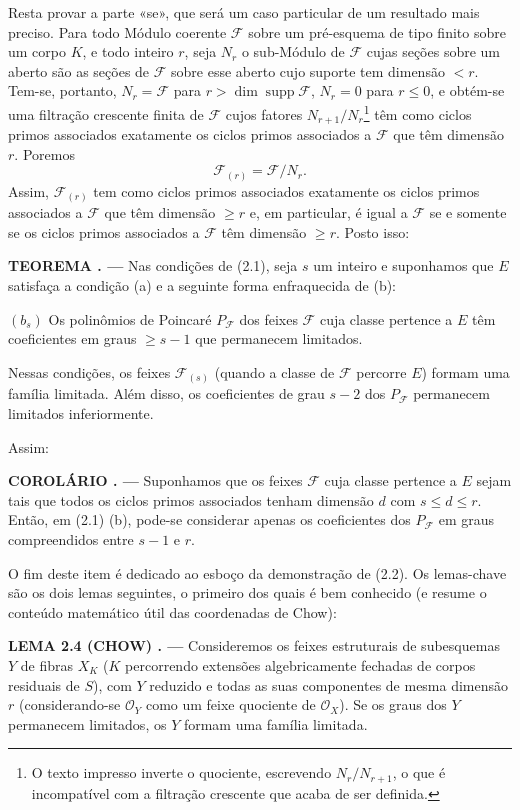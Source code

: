 \documentclass[11pt,twoside,openany]{book}
\numberwithin{equation}{section}
\newcommand{\src}[1]{%
  \phantomsection\hypertarget{src:#1}{}%
  \marginpar{\raggedleft\footnotesize\sffamily #1}%
}
\theoremstyle{plain}
\theoremstyle{definition}
\theoremstyle{remark}
\newcommand{\result}[2]{%
  \par\medskip\noindent\textbf{#1%
  \if\relax\detokenize{#2}\relax\else\space#2\fi. ---}\enspace
}
\newcommand{\FgaUnitKey}{frontmatter}
\renewcommand{\src}[1]{%
  \phantomsection\hypertarget{src:\FgaUnitKey:#1}{}%
  \marginpar{\raggedleft\footnotesize\sffamily #1}%
}
\begin{document}
Resta provar a parte «se», que será um caso particular de um resultado mais
preciso. Para todo Módulo coerente $\mathcal F$ sobre um pré-esquema de tipo
finito sobre um corpo $K$, e todo inteiro $r$, seja $N_r$ o sub-Módulo de
$\mathcal F$ cujas seções sobre um aberto são as seções de $\mathcal F$ sobre
esse aberto cujo suporte tem dimensão $<r$. Tem-se, portanto,
$N_r=\mathcal F$ para $r>\dim\operatorname{supp}\mathcal F$, $N_r=0$ para
$r\leq0$, e obtém-se uma filtração crescente finita de $\mathcal F$ cujos
fatores $N_{r+1}/N_r$\footnote{O texto impresso inverte o quociente, escrevendo
$N_r/N_{r+1}$, o que é incompatível com a filtração crescente que acaba de ser
definida.} têm como ciclos primos associados exatamente os ciclos primos
associados a $\mathcal F$ que têm dimensão $r$. Poremos
\[
\mathcal F_{(r)}=\mathcal F/N_r.
\]
Assim, $\mathcal F_{(r)}$ tem como ciclos primos associados exatamente os
ciclos primos associados a $\mathcal F$ que têm dimensão $\geq r$ e, em
particular, é igual a $\mathcal F$ se e somente se os ciclos primos associados
a $\mathcal F$ têm dimensão $\geq r$. Posto isso:

\result{TEOREMA}{2.2} Nas condições de (2.1), seja $s$ um inteiro e suponhamos
que $E$ satisfaça a condição (a) e a seguinte forma enfraquecida de (b):

\medskip
\noindent $(b_s)$ Os polinômios de Poincaré $P_{\mathcal F}$ dos feixes
$\mathcal F$ cuja classe pertence a $E$ têm coeficientes em graus
$\geq s-1$ que permanecem limitados.

Nessas condições, os feixes $\mathcal F_{(s)}$ (quando a classe de
$\mathcal F$ percorre $E$) formam uma família limitada. Além disso, os
coeficientes de grau $s-2$ dos $P_{\mathcal F}$ permanecem limitados
inferiormente.
\src{255}
Assim:

\result{COROLÁRIO}{2.3} Suponhamos que os feixes $\mathcal F$ cuja classe
pertence a $E$ sejam tais que todos os ciclos primos associados tenham dimensão
$d$ com $s\leq d\leq r$. Então, em (2.1) (b), pode-se considerar apenas os
coeficientes dos $P_{\mathcal F}$ em graus compreendidos entre $s-1$ e $r$.

O fim deste item é dedicado ao esboço da demonstração de (2.2). Os lemas-chave
são os dois lemas seguintes, o primeiro dos quais é bem conhecido (e resume o
conteúdo matemático útil das coordenadas de Chow):

\result{LEMA 2.4 (CHOW)}{} Consideremos os feixes estruturais de subesquemas
$Y$ de fibras $X_K$ ($K$ percorrendo extensões algebricamente fechadas de
corpos residuais de $S$), com $Y$ reduzido e todas as suas componentes de mesma
dimensão $r$ (considerando-se $\mathcal O_Y$ como um feixe quociente de
$\mathcal O_X$). Se os graus dos $Y$ permanecem limitados, os $Y$ formam uma
família limitada.
\end{document}
